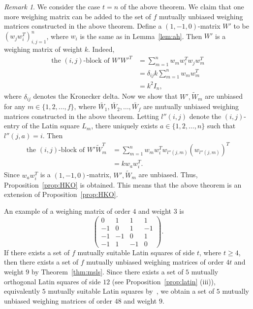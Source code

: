 \documentclass[12pt]{article}
\theoremstyle{remark}
\newtheorem{rem}[thm]{Remark}
\begin{document}
\begin{rem}
We consider the case $t=n$ of the above theorem.
We claim that one more weighing matrix can be added to the set of
$f$ mutually unbiased weighing matrices constructed in the above theorem.
Define a $(1,-1,0)$-matrix $W'$ to be $(w_j w_i^T)_{i,j=1}^n$, where
$w_i$ is the same as in Lemma~\ref{lem:ah}. 
Then $W'$ is a weighing matrix of weight $k$. Indeed, 
\begin{align*}
\text{the $(i,j)$-block of }W'W'^T&=\sum_{m=1}^n w_m w_i^T w_j w_m^T \\
&=\delta_{ij}k\sum_{m=1}^n w_m w_m^T \\ &=k^2 I_n, 
\end{align*}
where $\delta_{ij}$ denotes the Kronecker delta. 
Now we show that $W', \widetilde{W}_m$ are unbiased for any $m\in\{1,2,\ldots,f\}$, 
where $\widetilde{W_1},\widetilde{W_2},\ldots,\widetilde{W_f}$ are mutually unbiased weighing matrices constructed in the above theorem. 
Letting $l''(i,j)$ denote the $(i,j)$-entry of the Latin square $L_m$, there uniquely 
exists $a\in\{1,2,\ldots,n\}$ such that $l''(j,a)=i$.
Then
\begin{align*}
\text{the $(i,j)$-block of }W'\widetilde{W}_m^T
&=\sum_{m=1}^n w_m w_i^T w_{l''(j,m)} (w_{l''(j,m)})^T\\
&= k w_a w_{i}^T.
\end{align*}
Since $w_a w_{i}^T$ is a $(1,-1,0)$-matrix, $W', \widetilde{W}_{m}$ are unbiased. 
Thus, Proposition~\ref{prop:HKO} is obtained.  
This means that the above theorem is an extension of Proposition~\ref{prop:HKO}.
\end{rem}


An example of a weighing matrix of order $4$ and weight $3$ is 
\[
\left(
\begin{array}{rrrr}
  0 & 1 & 1 & 1 \\
  -1 & 0 & 1 & -1\\
  -1 & -1 & 0 & 1\\
  -1 & 1 & -1 & 0
\end{array}
\right).
\]
If there exists a set of $f$ mutually suitable Latin squares of side $t$, 
where $t\geq 4$, then 
there exists a set of $f$ mutually unbiased weighing matrices of order $4t$ and weight $9$
by Theorem~\ref{thm:msls}.
Since there exists a set of $5$ mutually orthogonal Latin squares of side $12$
(see Proposition~\ref{prop:latin} (iii)), equivalently $5$ mutually suitable Latin squares
by~\cite[Lemma~2.3]{HKO},
we obtain a set of $5$ mutually unbiased weighing matrices of order $48$ and weight $9$. 
\end{document}
